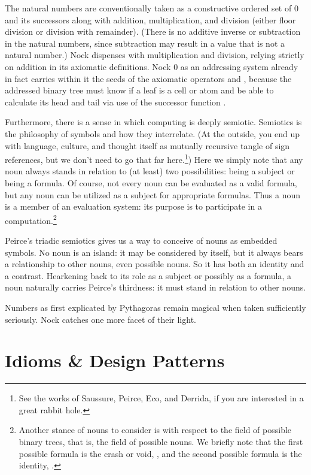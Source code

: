 The natural numbers are conventionally taken as a constructive ordered set of 0 and its successors along with addition, multiplication, and division (either floor division or division with remainder).  (There is no additive inverse or subtraction in the natural numbers, since subtraction may result in a value that is not a natural number.)  Nock dispenses with multiplication and division, relying strictly on addition in its axiomatic definitions.  Nock 0 as an addressing system already in fact carries within it the seeds of the axiomatic operators  and \textct{+}, because the addressed binary tree must know if a leaf is a cell or atom and be able to calculate its head and tail via use of the successor function \textct{+}.

Furthermore, there is a sense in which computing is deeply semiotic.  Semiotics is the philosophy of symbols and how they interrelate.  (At the outside, you end up with language, culture, and thought itself as mutually recursive tangle of sign references, but we don't need to go that far here.\footnote{See the works of Saussure, Peirce, Eco, and Derrida, if you are interested in a great rabbit hole.})  Here we simply note that any noun always stands in relation to (at least) two possibilities:  being a subject or being a formula.  Of course, not every noun can be evaluated as a valid formula, but any noun can be utilized as a subject for appropriate formulas.  Thus a noun is a member of an evaluation system:  its purpose is to participate in a computation.\footnote{Another stance of nouns to consider is with respect to the field of possible binary trees, that is, the field of possible nouns.  We briefly note that the first possible formula is the crash or void, \textct{[0 0]}, and the second possible formula is the identity, \textct{[0 1]}.}

Peirce's triadic semiotics gives us a way to conceive of nouns as embedded symbols.  No noun is an island:  it may be considered by itself, but it always bears a relationship to other nouns, even possible nouns.  So it has both an identity and a contrast.  Hearkening back to its role as a subject or possibly as a formula, a noun naturally carries Peirce's thirdness:  it must stand in relation to other nouns.

Numbers as first explicated by Pythagoras remain magical when taken sufficiently seriously.  Nock catches one more facet of their light.

\section{Idioms \& Design Patterns}

